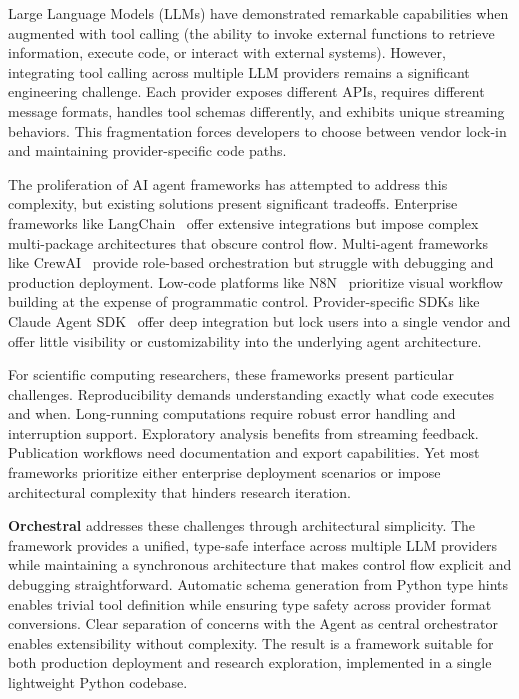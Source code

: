 \documentclass{article}
\begin{document}
Large Language Models (LLMs) have demonstrated remarkable capabilities when augmented with tool calling (the ability to invoke external functions to retrieve information, execute code, or interact with external systems). However, integrating tool calling across multiple LLM providers remains a significant engineering challenge. Each provider exposes different APIs, requires different message formats, handles tool schemas differently, and exhibits unique streaming behaviors. This fragmentation forces developers to choose between vendor lock-in and maintaining provider-specific code paths.

The proliferation of AI agent frameworks has attempted to address this complexity, but existing solutions present significant tradeoffs. Enterprise frameworks like LangChain~\cite{langchain} offer extensive integrations but impose complex multi-package architectures that obscure control flow. Multi-agent frameworks like CrewAI~\cite{crewai} provide role-based orchestration but struggle with debugging and production deployment. Low-code platforms like N8N~\cite{n8n} prioritize visual workflow building at the expense of programmatic control. Provider-specific SDKs like Claude Agent SDK~\cite{claude-sdk} offer deep integration but lock users into a single vendor and offer little visibility or customizability into the underlying agent architecture.

For scientific computing researchers, these frameworks present particular challenges. Reproducibility demands understanding exactly what code executes and when. Long-running computations require robust error handling and interruption support. Exploratory analysis benefits from streaming feedback. Publication workflows need documentation and export capabilities. Yet most frameworks prioritize either enterprise deployment scenarios or impose architectural complexity that hinders research iteration.

\textbf{Orchestral} addresses these challenges through architectural simplicity. The framework provides a unified, type-safe interface across multiple LLM providers while maintaining a synchronous architecture that makes control flow explicit and debugging straightforward. Automatic schema generation from Python type hints enables trivial tool definition while ensuring type safety across provider format conversions. Clear separation of concerns with the Agent as central orchestrator enables extensibility without complexity. The result is a framework suitable for both production deployment and research exploration, implemented in a single lightweight Python codebase.
\end{document}
